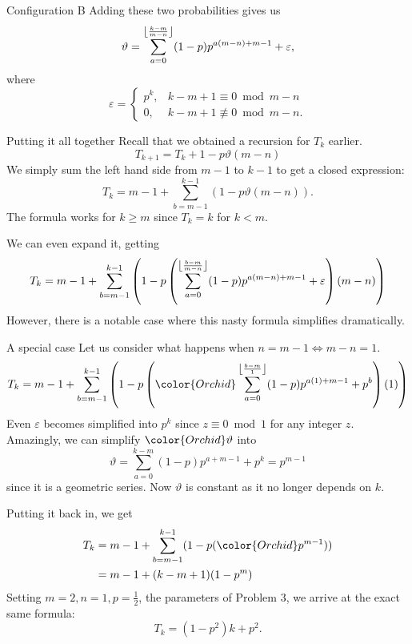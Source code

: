 \documentclass[xcolor={usenames,dvipsnames}]{beamer}
\DeclarePairedDelimiter\floor{\lfloor}{\rfloor}
\begin{document}
\begin{frame}{Configuration B}
  Adding these two probabilities gives us \[
    \vartheta = \sum_{a=0}^{\floor*{\frac{k-m}{m-n}}} (1-p)p^{a(m-n)+m-1} + \varepsilon,
  \] where \[
    \varepsilon = \begin{cases} p^{k}, &k-m+1 \equiv 0 \bmod m-n \\ 0, &k-m+1 \not\equiv 0 \bmod m-n. \end{cases}
  \] 
\end{frame}

\begin{frame}{Putting it all together}
  Recall that we obtained a recursion for  $T_k$ earlier.
  \[T_{k+1} = T_k + 1 - p\vartheta(m - n)\]
  We simply sum the left hand side from $m-1$ to $k-1$ to get a closed expression:
  \begin{equation*}
  T_k = m-1 + \sum_{b=m-1}^{k-1} \left(1-p\vartheta(m-n)\right).
  \end{equation*}
  The formula works for $k \ge m$ since $T_k = k$ for  $k<m$.
\end{frame}

\begin{frame}
  We can even expand it, getting
  \[
  T_k = m-1+\sum _{b=m-1}^{k-1} \left(1-p \left(\sum _{a=0}^{\floor*{\frac{b-m}{m-n}} } (1-p) p^{a (m-n)+m-1}+\varepsilon\right) (m-n)\right)
  \] However, there is a notable case where this nasty formula simplifies dramatically.
\end{frame}

\begin{frame}{A special case}
  Let us consider what happens when $n = m-1 \iff m-n = 1$.
  \begin{equation*}
    T_k = m-1+\sum _{b=m-1}^{k-1} \left(1-p \left({\color{Orchid}\sum _{a=0}^{\floor*{\frac{b-m}{1}} } (1-p) p^{a (1)+m-1}+p^{b}}\right) (1)\right)
  \end{equation*}
  Even $\varepsilon$ becomes simplified into $p^{k}$ since $z \equiv 0 \bmod 1$ for any integer  $z$. Amazingly, we can simplify $\color{Orchid} \vartheta$ into  \[
    \vartheta = \sum _{a=0}^{k-m } (1-p) p^{a+m-1}+p^{k} = p^{m-1}
  \] since it is a geometric series. Now $\vartheta$ is constant as it no longer depends on  $k$.
\end{frame}
\begin{frame}
  Putting it back in, we get 
    \begin{align*}
      T_k &= m-1 + \sum_{b=m-1}^{k-1} (1-p({\color{Orchid} p^{m-1}})) \\
          &= m-1 + (k-m+1)(1-p^{m})
    \end{align*}
    Setting $m = 2, n = 1, p = \frac{1}{2}$, the parameters of Problem 3, we arrive at the exact same formula: \[
      T_k = (1 - p^2)k + p^2
    .\] 
\end{frame}
\end{document}
